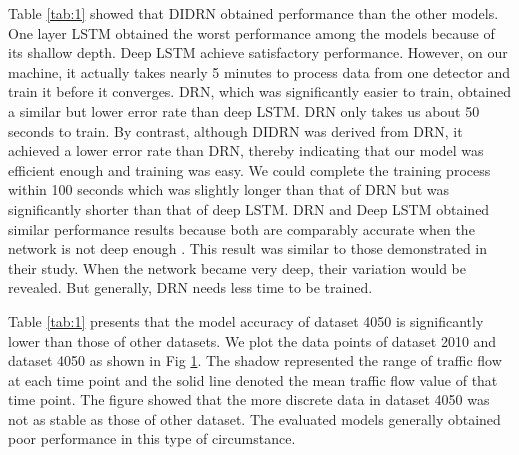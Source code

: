 \documentclass[twocolumn]{article}
\begin{document}
\par
Table \ref{tab:1} showed that DIDRN obtained performance than the other models. One layer LSTM obtained the worst performance among the models because of its shallow depth. Deep LSTM achieve satisfactory performance. However, on our machine, it actually takes nearly 5 minutes to process data from one detector and train it before it converges. DRN, which was significantly easier to train, obtained a similar but lower error rate than deep LSTM. DRN only takes us about 50 seconds to train. By contrast, although DIDRN was derived from DRN, it achieved a lower error rate than DRN, thereby indicating that our model was efficient enough and training was easy. We could complete the training process within 100 seconds which was slightly longer than that of DRN but was significantly shorter than that of deep LSTM. DRN and Deep LSTM obtained similar performance results because both are comparably accurate when the network is not deep enough \citep{DRN}. This result was similar to those demonstrated in their study. When the network became very deep, their variation would be revealed. But generally, DRN needs less time to be trained.
\par
Table \ref{tab:1} presents that the model accuracy of dataset 4050 is significantly lower than those of other datasets. We plot the data points of dataset 2010 and dataset 4050 as shown in Fig \ref{fig:goodbad}. The shadow represented the range of traffic flow at each time point and the solid line denoted the mean traffic flow value of that time point. The figure showed that the more discrete data in dataset 4050 was not as stable as those of other dataset.  The evaluated models generally obtained poor performance in this type of circumstance.

\begin{figure}[t]
    \centering
    \label{fig:goodbad}
\end{figure}
\end{document}
